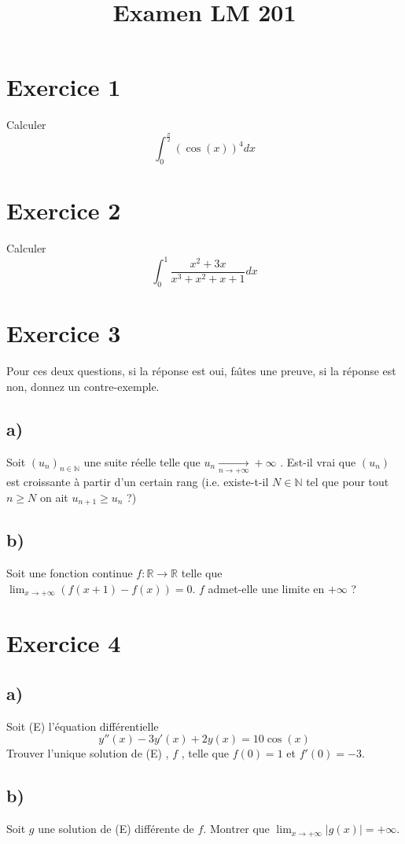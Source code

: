\documentclass{article}
\begin{document}
\title{Examen LM 201}
\maketitle


\section*{Exercice 1}

Calculer 
$$ \int_0^{\frac{\pi}{2}} (\cos (x) )^4 dx$$


\section*{Exercice 2}
Calculer 
$$\int_0^1 \frac{x^2+3x}{x^3+x^2+x+1}dx$$

\section*{Exercice 3}
Pour ces deux questions, si la r{\'e}ponse est oui, fa{\^\i}tes une preuve, si la r{\'e}ponse est non, donnez un contre-exemple.
\subsection*{a)}
Soit $(u_n)_{n\in \mathbb{N}}$ une suite r{\'e}elle telle que $u_n \xrightarrow[ n \to + \infty]{} + \infty $ . Est-il vrai que $(u_n)$ est croissante {\`a} partir d'un certain rang (i.e. existe-t-il $N \in \mathbb{N} $ tel que pour tout $n \geq N$ on ait $u_{n+1} \geq u_n$ ?)

\subsection*{ b) }
Soit une fonction continue $f : \mathbb{R} \rightarrow \mathbb{R}$ telle que $\lim_{x \to + \infty} ( f(x+1)-f(x) ) =0$. $f$ admet-elle une limite en $+ \infty$ ?

\section*{Exercice 4}
\subsection*{a)}
Soit (E) l'{\'e}quation diff{\'e}rentielle 
$$y''(x)-3y'(x)+2y(x)=10 \cos(x)$$
Trouver l'unique solution de (E) , $f$ , telle que $f(0)=1$ et $f'(0)=-3$.

\subsection*{b)}
Soit $g$ une solution de (E) diff{\'e}rente de $f$. Montrer que $ \lim_ {x \to + \infty} |g(x)| = + \infty$.
\end{document}
